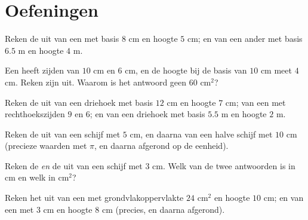 \section{Oefeningen}

\begin{exercise}[$\star$]\label{exo:g7:areas:1}
Reken de  uit van een  met basis $8$ cm en hoogte $5$ cm;
en van een ander met basis $6.5$ m en hoogte $4$ m.
\end{exercise}

\begin{exercise}[$\star$]\label{exo:g7:areas:2}
Een  heeft zijden van $10$ cm en $6$ cm, en de hoogte bij de basis van
$10$ cm meet $4$ cm. Reken zijn  uit. Waarom is het antwoord geen $60$
cm$^2$?
\end{exercise}

\begin{exercise}[$\star$]\label{exo:g7:areas:3}
Reken de  uit van een driehoek met basis $12$ cm en hoogte $7$ cm; van een
 met rechthoekszijden $9$ en $6$; en van een driehoek met basis
$5.5$ m en hoogte $2$ m.
\end{exercise}

\begin{exercise}[$\star$]\label{exo:g7:areas:4}
Reken de  uit van een schijf met  $5$ cm, en daarna van een halve
schijf met  $10$ cm (precieze waarden met $\pi$, en daarna afgerond op de
eenheid).
\end{exercise}

\begin{exercise}[$\star$]\label{exo:g7:areas:5}
Reken de  \emph{en} de  uit van een schijf met  $3$ cm. Welk
van de twee antwoorden is in cm en welk in cm$^2$?
\end{exercise}

\begin{exercise}[$\star$]\label{exo:g7:areas:6}
Reken het  uit van een  met grondvlakoppervlakte $24$ cm$^2$ en hoogte
$10$ cm; en van een  met  $3$ cm en hoogte $8$ cm (precies, en daarna
afgerond).
\end{exercise}


